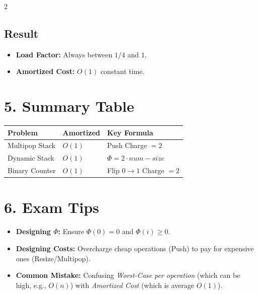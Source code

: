 \documentclass[10pt, a4paper]{article}
\begin{document}
\begin{multicols*}{2}
\subsection*{Result}
\begin{itemize}
    \item \textbf{Load Factor:} Always between $1/4$ and $1$.
    \item \textbf{Amortized Cost:} $O(1)$ constant time.
\end{itemize}

\section{5. Summary Table}
\begin{center}
\renewcommand{\arraystretch}{1.5}
\begin{tabular}{@{}p{} p{} p{}@{}}
\toprule
\textbf{Problem} & \textbf{Amortized} & \textbf{Key Formula} \\
\midrule
Multipop Stack & $O(1)$ & Push Charge $= 2$ \\
Dynamic Stack & $O(1)$ & $\Phi = 2 \cdot num - size$ \\
Binary Counter & $O(1)$ & Flip $0 \to 1$ Charge $= 2$ \\
\bottomrule
\end{tabular}
\end{center}

\section{6. Exam Tips}
\begin{itemize}
    \item \textbf{Designing $\Phi$:} Ensure $\Phi(0) = 0$ and $\Phi(i) \ge 0$.
    \item \textbf{Designing Costs:} Overcharge cheap operations (Push) to pay for expensive ones (Resize/Multipop).
    \item \textbf{Common Mistake:} Confusing \textit{Worst-Case per operation} (which can be high, e.g., $O(n)$) with \textit{Amortized Cost} (which is average $O(1)$).
\end{itemize}

\end{multicols*}
\end{document}
